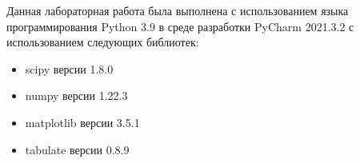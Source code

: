 Данная лабораторная работа была выполнена с использованием языка
программирования Python 3.9 в среде разработки PyCharm 2021.3.2 с
использованием следующих библиотек:
\begin{itemize}
\item scipy версии 1.8.0
\item numpy версии 1.22.3
\item matplotlib версии 3.5.1
\item tabulate версии 0.8.9
\end{itemize}